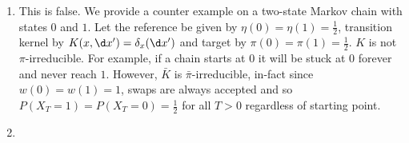 \documentclass{article}
\begin{document}
\begin{enumerate}
    \item %
    This is false. We provide a counter example on a two-state Markov chain
    with states $0$ and $1$. Let the reference be given by
     $\eta(0)=\eta(1)=\frac 1 2$, transition kernel by $K(x,\d x')=\delta_x(\d x')$
     and target by $\pi(0) = \pi(1) = \frac 1 2$.
    $K$ is not $\pi$-irreducible. For example, if a chain starts at $0$ it will be stuck at $0$
    forever and never reach $1$. However, $\bar K$ is $\bar\pi$-irreducible, in-fact
    since $w(0) = w(1) = 1$, swaps are always accepted and so $P(X_T = 1) = P(X_T = 0) = \frac 1 2$
    for all $T > 0$ regardless of starting point. 
    \item %

\end{enumerate}
\end{document}
